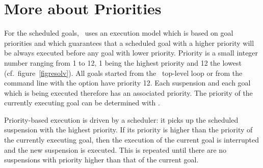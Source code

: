 {\section{More about Priorities}
For the scheduled goals,
\eclipse\ uses an execution model which is based on goal priorities
and which guarantees that a scheduled goal with a higher priority
will be always executed before any goal with lower priority.
Priority is a small integer number ranging from 1 to 12,
1 being the highest priority and 12 the lowest
(cf.\ figure~\ref{figresolv}).
All goals started from the \eclipse\ top-level loop
or from the command line with the  option have priority 12.
Each suspension and each goal which is being
executed therefore has an associated priority.
The priority of the currently executing goal can be determined
with .

Priority-based execution is driven by a scheduler:
it picks up the scheduled suspension with the highest priority.
If its priority is higher than the priority of the currently
executing goal, then the execution of the current goal
is interrupted and the new suspension is executed.
This is repeated until there are no suspensions
with priority higher than that of the current goal.


}
